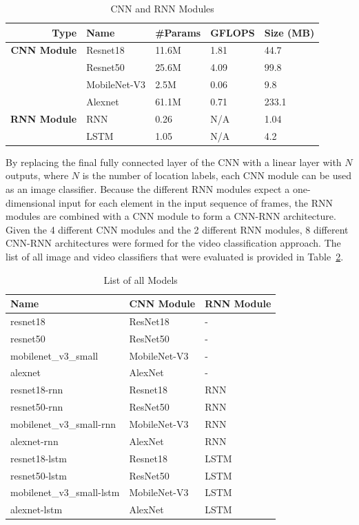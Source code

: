 \documentclass{article}
\begin{document}
  \begin{table}[ht]
    \centering
    \begin{tabular}{rllll}
      \toprule
      Type & Name & \#Params & GFLOPS & Size (MB) \\
      \midrule
      \textbf{CNN Module} & Resnet18~\cite{resnet} & 11.6M & 1.81 & 44.7 \\
                          & Resnet50~\cite{resnet} & 25.6M & 4.09 & 99.8 \\
                          & MobileNet-V3 & 2.5M & 0.06 & 9.8 \\
                          & Alexnet & 61.1M & 0.71 & 233.1 \\
      \midrule
      \textbf{RNN Module} & RNN & 0.26 & N/A & 1.04 \\
                          & LSTM & 1.05 & N/A & 4.2 \\
      \bottomrule
    \end{tabular}
    \caption{CNN and RNN Modules}
    \label{tab:modules}
  \end{table}

  By replacing the final fully connected layer of the CNN with a linear layer
  with $N$ outputs, where $N$ is the number of location labels, each CNN module
  can be used as an image classifier. Because the different RNN modules expect a
  one-dimensional input for each element in the input sequence of frames, the
  RNN modules are combined with a CNN module to form a CNN-RNN architecture.
  Given the 4 different CNN modules and the 2 different RNN modules, 8 different
  CNN-RNN architectures were formed for the video classification approach. The
  list of all image and video classifiers that were evaluated is provided in
  Table~\ref{tab:models}.


  \begin{table}[ht]
    \centering
    \begin{tabular}{lll}
      \toprule
      \bfseries Name & \bfseries CNN Module & \bfseries RNN Module \\
      \midrule
      resnet18 & ResNet18 & - \\
      resnet50 & ResNet50 & - \\
      mobilenet\_v3\_small & MobileNet-V3 & - \\
      alexnet & AlexNet & - \\
      \midrule
      resnet18-rnn & Resnet18 & RNN \\
      resnet50-rnn & ResNet50 & RNN \\
      mobilenet\_v3\_small-rnn & MobileNet-V3 & RNN \\
      alexnet-rnn & AlexNet & RNN \\
      resnet18-lstm & Resnet18 & LSTM \\
      resnet50-lstm & ResNet50 & LSTM \\
      mobilenet\_v3\_small-lstm & MobileNet-V3 & LSTM \\
      alexnet-lstm & AlexNet & LSTM \\
      \bottomrule
    \end{tabular}
    \caption{List of all Models}
    \label{tab:models}
  \end{table}
\end{document}
